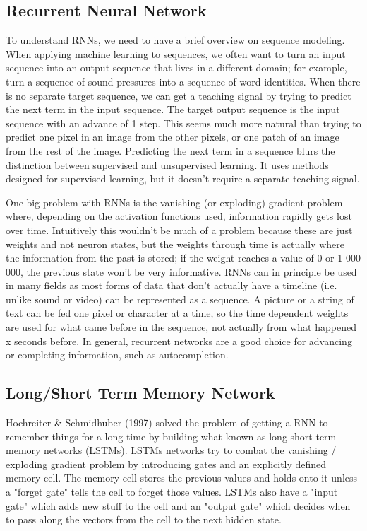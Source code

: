  \subsection{Recurrent Neural Network}

To understand RNNs, we need to have a brief overview on sequence modeling. When applying machine learning to sequences, we often want to turn an input sequence into an output sequence that lives in a different domain; for example, turn a sequence of sound pressures into a sequence of word identities. When there is no separate target sequence, we can get a teaching signal by trying to predict the next term in the input sequence. The target output sequence is the input sequence with an advance of 1 step. This seems much more natural than trying to predict one pixel in an image from the other pixels, or one patch of an image from the rest of the image. Predicting the next term in a sequence blurs the distinction between supervised and unsupervised learning. It uses methods designed for supervised learning, but it doesn't require a separate teaching signal.

One big problem with RNNs is the vanishing (or exploding) gradient problem where, depending on the activation functions used, information rapidly gets lost over time. Intuitively this wouldn't be much of a problem because these are just weights and not neuron states, but the weights through time is actually where the information from the past is stored; if the weight reaches a value of 0 or 1 000 000, the previous state won't be very informative. RNNs can in principle be used in many fields as most forms of data that don't actually have a timeline (i.e. unlike sound or video) can be represented as a sequence. A picture or a string of text can be fed one pixel or character at a time, so the time dependent weights are used for what came before in the sequence, not actually from what happened x seconds before. In general, recurrent networks are a good choice for advancing or completing information, such as autocompletion.


\subsection{Long/Short Term Memory Network}
Hochreiter & Schmidhuber (1997) solved the problem of getting a RNN to remember things for a long time by building what known as long-short term memory networks (LSTMs). LSTMs networks try to combat the vanishing / exploding gradient problem by introducing gates and an explicitly defined memory cell. The memory cell stores the previous values and holds onto it unless a "forget gate" tells the cell to forget those values. LSTMs also have a "input gate" which adds new stuff to the cell and an "output gate" which decides when to pass along the vectors from the cell to the next hidden state.

